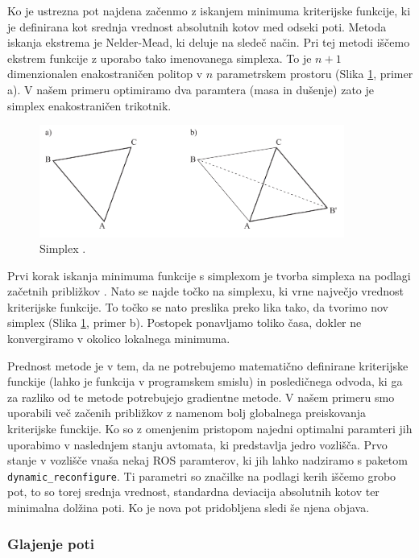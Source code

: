 Ko je ustrezna pot najdena začenmo z iskanjem minimuma kriterijske funkcije, ki je definirana kot srednja vrednost absolutnih kotov med odseki poti. Metoda iskanja ekstrema je Nelder-Mead, ki deluje na sledeč način. Pri tej metodi iščemo ekstrem funkcije z uporabo tako imenovanega simplexa. To je $n+1$ dimenzionalen enakostraničen politop v $n$ parametrskem prostoru (Slika \ref{fig:slika6}, primer a). V našem primeru optimiramo dva paramtera (masa in dušenje) zato je simplex enakostraničen trikotnik.

\begin{figure}[H]
	\centering
	\includegraphics[width=10cm]{pic/simplex.png}
	\caption{Simplex \cite{vir11}.}
	\label{fig:slika6}
\end{figure}

Prvi korak iskanja minimuma funkcije s simplexom je tvorba simplexa na podlagi začetnih približkov \cite{vir11}. Nato se najde točko na simplexu, ki vrne največjo vrednost kriterijske funkcije. To točko se nato preslika preko lika tako, da tvorimo nov simplex (Slika \ref{fig:slika6}, primer b). Postopek ponavljamo toliko časa, dokler ne konvergiramo v okolico lokalnega minimuma.

Prednost metode je v tem, da ne potrebujemo matematično definirane kriterijske funckije (lahko je funkcija v programskem smislu) in posledičnega odvoda, ki ga za razliko od te metode potrebujejo gradientne metode. V našem primeru smo uporabili več začenih približkov z namenom bolj globalnega preiskovanja kriterijske funckije. Ko so z omenjenim pristopom najedni optimalni paramteri jih uporabimo v naslednjem stanju avtomata, ki predstavlja jedro vozlišča. Prvo stanje v vozlišče vnaša nekaj ROS paramterov, ki jih lahko nadziramo s paketom \texttt{dynamic\_reconfigure}. Ti parametri so značilke na podlagi kerih iščemo grobo pot, to so torej srednja vrednost, standardna deviacija absolutnih kotov ter minimalna dolžina poti. Ko je nova pot pridobljena sledi še njena objava.

\subsubsection{Glajenje poti}


